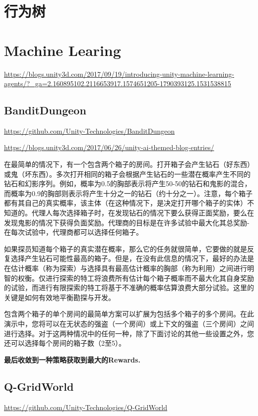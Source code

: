\documentclass[UTF8,a4paper,12pt]{ctexbook}
\begin{document}
	\section{行为树}
		
	
	\section{Machine Learing}
		\url{https://blogs.unity3d.com/2017/09/19/introducing-unity-machine-learning-agents/?_ga=2.160895102.2116653917.1574651205-1790393125.1531538815}

		
		\subsection{BanditDungeon}
			\url{https://github.com/Unity-Technologies/BanditDungeon}
			
			\url{https://blogs.unity3d.com/2017/06/26/unity-ai-themed-blog-entries/}
			
			在最简单的情况下，有一个包含两个箱子的房间。打开箱子会产生钻石（好东西）或鬼（坏东西）。多次打开相同的箱子会根据产生钻石的一些潜在概率产生不同的钻石和幻影序列。例如，概率为0.5的胸部表示将产生50-50的钻石和鬼影的混合，而概率为0.9的胸部则表示将产生十分之一的钻石（约十分之一）。注意，每个箱子都有其自己的真实概率，该主体（在这种情况下，是决定打开哪个箱子的实体）不知道的。代理人每次选择箱子时，在发现钻石的情况下要么获得正面奖励，要么在发现鬼影的情况下获得负面奖励。代理商的目标是在许多试验中最大化其总奖励-在每次试验中，代理商都可以选择任何箱子。
			
			如果探员知道每个箱子的真实潜在概率，那么它的任务就很简单，它要做的就是反复选择产生钻石可能性最高的箱子。但是，在没有此信息的情况下，最好的办法是在估计概率（称为探索）与选择具有最高估计概率的胸部（称为利用）之间进行明智的权衡。仅进行探索的特工将浪费所有估计每个箱子概率而不最大化其自身奖励的试验，而进行有限探索的特工将基于不准确的概率估算浪费大部分试验。这里的关键是如何有效地平衡勘探与开发。
			
			包含两个箱子的单个房间的最简单方案可以扩展为包括多个箱子的多个房间。在此演示中，您将可以在无状态的强盗（一个房间）或上下文的强盗（三个房间）之间进行选择。对于这两种情况中的任何一种，除了下面讨论的其他一些设置之外，您还可以选择每个房间的箱子数（2至5）。
			
			\textbf{最后收敛到一种策略获取到最大的Rewards.}
		
		
		\subsection{Q-GridWorld}
			\url{https://github.com/Unity-Technologies/Q-GridWorld}
			
\end{document}
